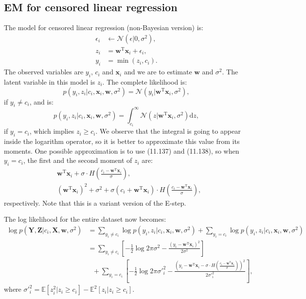 \documentclass[UTF8]{ctexart}
\begin{document}
\subsection{EM for censored linear regression}
The model for censored linear regression (non-Bayesian version) is:
$$
\begin{aligned}
\epsilon_{i}&\leftarrow\mathcal{N}(\epsilon|0,\sigma^{2}),\\
z_{i}&=\textbf{w}^{\text{T}}\textbf{x}_{i}+\epsilon_{i},\\
y_{i}&=\min(z_{i},c_{i}).
\end{aligned}
$$
The observed variables are $y_{i}$, $c_{i}$ and $\textbf{x}_{i}$ and we are to estimate $\textbf{w}$ and $\sigma^{2}$.
The latent variable in this model is $z_{i}$.
The complete likelihood is:
$$p(y_{i},z_{i}|c_{i},\textbf{x}_{i},\textbf{w},\sigma^{2})=\mathcal{N}(y_{i}|\textbf{w}^{\text{T}}\textbf{x}_{i},\sigma^{2}),$$
if $y_{i}\neq c_{i}$, and is:
$$p(y_{i},z_{i}|c_{i},\textbf{x}_{i},\textbf{w},\sigma^{2})=\int_{c_{i}}^{\infty}\mathcal{N}(z|\textbf{w}^{\text{T}}\textbf{x}_{i},\sigma^{2})\text{d}z,$$
if $y_{i}=c_{i}$, which implies $z_{i}\geq c_{i}$.
We observe that the integral is going to appear inside the logarithm operator, so it is better to approximate this value from its moments.
One possible approximation is to use (11.137) and (11.138), so when $y_{i}=c_{i}$, the first and the second moment of $z_{i}$ are:
$$
\begin{aligned}
&\textbf{w}^{\text{T}}\textbf{x}_{i}+\sigma\cdot H\left(\frac{c_{i}-\textbf{w}^{\text{T}}\textbf{x}_{i}}{\sigma} \right),\\
&(\textbf{w}^{\text{T}}\textbf{x}_{i})^{2}+\sigma^{2}+\sigma(c_{i}+\textbf{w}^{\text{T}}\textbf{x}_{i})\cdot H\left(\frac{c_{i}-\textbf{w}^{\text{T}}\textbf{x}_{i}}{\sigma} \right),
\end{aligned}
$$
respectively.
Note that this is a variant version of the E-step.

The log likelihood for the entire dataset now becomes:
$$
\begin{aligned}
\log p(\textbf{Y},\textbf{Z}|c_{i},\textbf{X},\textbf{w},\sigma^{2})&=\sum_{y_{i}\neq c_{i}}\log p(y_{i},z_{i}|c_{i},\textbf{x}_{i},\textbf{w},\sigma^{2})+\sum_{y_{i}= c_{i}}\log p(y_{i},z_{i}|c_{i},\textbf{x}_{i},\textbf{w},\sigma^{2})\\
&=\sum_{y_{i}\neq c_{i}}\left[-\frac{1}{2}\log 2\pi\sigma^{2}-\frac{(y_{i}-\textbf{w}^{\text{T}}\textbf{x}_{i})^{2}}{2\sigma^{2}} \right]\\
&\ \ \ +\sum_{y_{i}=c_{i}}\left[-\frac{1}{2}\log 2\pi\sigma'^{2}_{i}-\frac{\left(y_{i}-\textbf{w}^{\text{T}}\textbf{x}_{i}-\sigma\cdot H\left(\frac{c_{i}-\textbf{w}^{\text{T}}\textbf{x}_{i}}{\sigma} \right)\right)^{2}}{2\sigma'^{2}_{i}} \right],
\end{aligned}
$$
where $\sigma'^{2}_{i}=\mathbb{E}[z_{i}^{2}|z_{i}\geq c_{i}]-\mathbb{E}^{2}[z_{i}|z_{i}\geq c_{i}]$.
\end{document}
